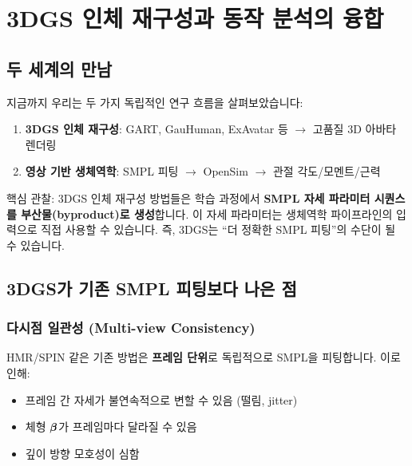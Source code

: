 \documentclass[11pt, a4paper]{report}
\begin{document}
\chapter{3DGS 인체 재구성과 동작 분석의 융합}
\label{ch:fusion}

\section{두 세계의 만남}

지금까지 우리는 두 가지 독립적인 연구 흐름을 살펴보았습니다:

\begin{enumerate}[leftmargin=*]
  \item \textbf{3DGS 인체 재구성}: GART, GauHuman, ExAvatar 등 $\rightarrow$ 고품질 3D 아바타 렌더링
  \item \textbf{영상 기반 생체역학}: SMPL 피팅 $\rightarrow$ OpenSim $\rightarrow$ 관절 각도/모멘트/근력
\end{enumerate}

\begin{keyidea}
핵심 관찰: 3DGS 인체 재구성 방법들은 학습 과정에서 \textbf{SMPL 자세 파라미터 시퀀스를 부산물(byproduct)로 생성}합니다. 이 자세 파라미터는 생체역학 파이프라인의 입력으로 직접 사용할 수 있습니다. 즉, 3DGS는 ``더 정확한 SMPL 피팅''의 수단이 될 수 있습니다.
\end{keyidea}


\section{3DGS가 기존 SMPL 피팅보다 나은 점}

\subsection{다시점 일관성 (Multi-view Consistency)}

HMR/SPIN 같은 기존 방법은 \textbf{프레임 단위}로 독립적으로 SMPL을 피팅합니다. 이로 인해:
\begin{itemize}[leftmargin=*]
  \item 프레임 간 자세가 불연속적으로 변할 수 있음 (떨림, jitter)
  \item 체형 $\bm{\beta}$가 프레임마다 달라질 수 있음
  \item 깊이 방향 모호성이 심함
\end{itemize}
\end{document}
